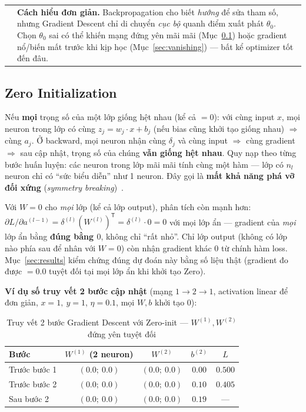 \documentclass[12pt,a4paper]{article}
\makeatletter
\newenvironment{tructiep}[1][Cách hiểu đơn giản]
  {\par\smallskip\noindent\begin{tabular}{@{}p{0.35em}@{\hspace{6pt}}p{\dimexpr\linewidth-1.9em\relax}@{}}
   \textcolor{boxln}{\rule{2pt}{\baselineskip}} & \textbf{#1.}\enspace\ignorespaces}
  {\end{tabular}\par\smallskip}
\newcommand{\en}[1]{\textit{#1}}
\newcommand{\T}{^{\mathsf{T}}}
\makeatother
\begin{document}
\begin{tructiep}
Backpropagation cho biết \emph{hướng} để sửa tham số, nhưng Gradient
Descent chỉ di chuyển \emph{cục bộ} quanh điểm xuất phát $\theta_0$. Chọn
$\theta_0$ sai có thể khiến mạng đứng yên mãi mãi (Mục~\ref{sec:zero}) hoặc
gradient nổ/biến mất trước khi kịp học (Mục~\ref{sec:vanishing}) --- bất
kể optimizer tốt đến đâu.
\end{tructiep}

\subsection{Zero Initialization}
\label{sec:zero}

Nếu \textbf{mọi} trọng số của một lớp giống hệt nhau (kể cả $=0$): với
cùng input $x$, mọi neuron trong lớp có cùng $z_j=w_j\cdot x+b_j$ (nếu bias
cũng khởi tạo giống nhau) $\Rightarrow$ cùng $a_j$. Ở backward, mọi neuron
nhận cùng $\delta_j$ và cùng input $\Rightarrow$ cùng gradient
$\Rightarrow$ sau cập nhật, trọng số của chúng \textbf{vẫn giống hệt
nhau}. Quy nạp theo từng bước huấn luyện: các neuron trong lớp mãi mãi
tính cùng một hàm --- lớp có $n_l$ neuron chỉ có ``sức biểu diễn'' như 1
neuron. Đây gọi là \textbf{mất khả năng phá vỡ đối xứng} (\en{symmetry
breaking})~\citep{goodfellow2016deep}.

Với $W=0$ cho \emph{mọi} lớp (kể cả lớp output), phân tích còn mạnh hơn:
$\partial L/\partial a^{(l-1)} = \delta^{(l)}(W^{(l)})\T = \delta^{(l)}\cdot
0 = 0$ với mọi lớp ẩn --- gradient của \emph{mọi} lớp ẩn bằng \textbf{đúng
bằng $0$}, không chỉ ``rất nhỏ''. Chỉ lớp output (không có lớp nào phía sau
để nhân với $W=0$) còn nhận gradient khác 0 từ chính hàm loss. Mục~\ref{sec:results}
kiểm chứng đúng dự đoán này bằng số liệu thật (gradient đo được $=0.0$
tuyệt đối tại mọi lớp ẩn khi khởi tạo Zero).

\textbf{Ví dụ số truy vết 2 bước cập nhật} (mạng $1\to2\to1$, activation
linear để đơn giản, $x=1,\ y=1$, $\eta=0.1$, mọi $W,b$ khởi tạo $0$):

\begin{table}[htbp]
\centering
\caption{Truy vết 2 bước Gradient Descent với Zero-init --- $W^{(1)},W^{(2)}$ đứng yên tuyệt đối}
\small
\begin{tabular}{@{}lcccc@{}}
\toprule
Bước & $W^{(1)}$ (2 neuron) & $W^{(2)}$ & $b^{(2)}$ & $L$ \\
\midrule
Trước bước 1 & $(0.0;\ 0.0)$ & $(0.0;\ 0.0)$ & $0.00$ & $0.500$ \\
Trước bước 2 & $(0.0;\ 0.0)$ & $(0.0;\ 0.0)$ & $0.10$ & $0.405$ \\
Sau bước 2 & $(0.0;\ 0.0)$ & $(0.0;\ 0.0)$ & $0.19$ & --- \\
\bottomrule
\end{tabular}
\label{tab:zerotrace}
\end{table}
\end{document}
